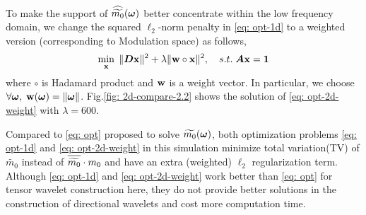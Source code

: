 To make the support of $\widehat{\widetilde{m_{0}}}(\boldsymbol{\omega})$ better concentrate within the low frequency domain, we change the squared $\ell_2$-norm penalty in \eqref{eq: opt-1d} to a weighted version (corresponding to Modulation space) as follows,
\begin{align}
\min_{\mathbf{x}}\; \Vert\boldsymbol{ D}\mathbf{x}\Vert^2 + \lambda\Vert \mathbf{w}\circ\mathbf{x}\Vert^2,\quad s.t. \; \boldsymbol{A}\mathbf{x} = \mathbf{1} \label{eq: opt-2d-weight}
\end{align} 
where $\circ$ is Hadamard product and $\mathbf{w}$ is a weight vector. In particular, we choose $\forall \boldsymbol{\omega}, \; \mathbf{w}(\boldsymbol{\omega}) = \Vert\boldsymbol{\omega}\Vert$. Fig.\ref{fig: 2d-compare-2.2} shows the solution of \eqref{eq: opt-2d-weight} with $\lambda=600$. %

Compared to \eqref{eq: opt} proposed to solve $\widetilde{m_{0}}(\boldsymbol{\omega})$, both optimization problems \eqref{eq: opt-1d} and \eqref{eq: opt-2d-weight} in this simulation minimize total variation(TV) of $\widetilde{m_0}$ instead of $\overlinespace{\widetilde{m_0}}\cdot m_0$ and have an extra (weighted) $\ell_2$ regularization term. Although \eqref{eq: opt-1d} and \eqref{eq: opt-2d-weight} work better than \eqref{eq: opt} for tensor wavelet construction here, they do not provide better solutions in the construction of directional wavelets and cost more computation time.

\begin{comment}
\begin{minipage}{.9\textwidth}
\centering
\texttt{[image: 2d-m-compare-2-1-eps-converted-to.pdf]}\\
\texttt{[image: 2d-filter-compare-2-1-eps-converted-to.pdf]}
\captionof{figure}{result of \eqref{eq: opt-2d-weight} $\mhat{0}$ ($\lambda = 60$), target $\m{0}$ and their difference, Top: frequency domain, Bottom: time domain}
\label{fig: 2d-compare-2}
\end{minipage}
\end{comment}

